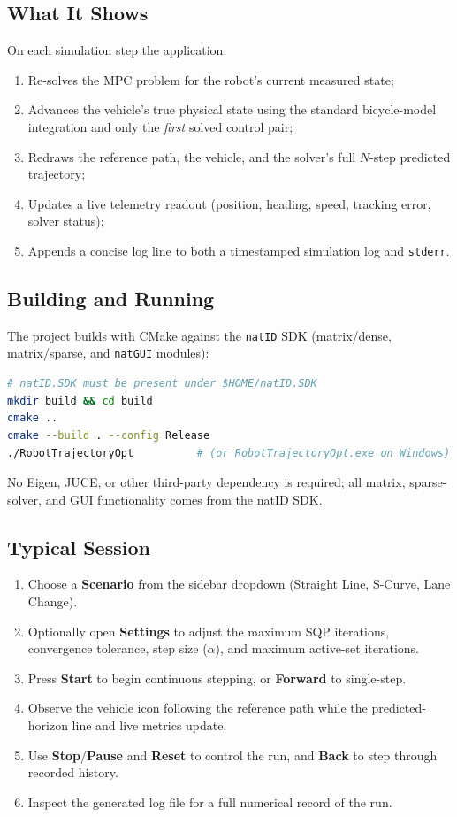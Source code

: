 ﻿\documentclass[11pt,a4paper]{article}
\begin{document}
\subsection{What It Shows}
On each simulation step the application:
\begin{enumerate}
  \item Re-solves the MPC problem for the robot's current measured state;
  \item Advances the vehicle's true physical state using the standard bicycle-model integration and only the \emph{first} solved control pair;
  \item Redraws the reference path, the vehicle, and the solver's full $N$-step predicted trajectory;
  \item Updates a live telemetry readout (position, heading, speed, tracking error, solver status);
  \item Appends a concise log line to both a timestamped simulation log and \texttt{stderr}.
\end{enumerate}

\subsection{Building and Running}
The project builds with CMake against the \texttt{natID} SDK (matrix/dense, matrix/sparse, and \texttt{natGUI} modules):
\begin{lstlisting}[language=bash]
# natID.SDK must be present under $HOME/natID.SDK
mkdir build && cd build
cmake ..
cmake --build . --config Release
./RobotTrajectoryOpt          # (or RobotTrajectoryOpt.exe on Windows)
\end{lstlisting}
No Eigen, JUCE, or other third-party dependency is required; all matrix, sparse-solver, and GUI functionality comes from the natID SDK.

\subsection{Typical Session}
\begin{enumerate}
  \item Choose a \textbf{Scenario} from the sidebar dropdown (Straight Line, S-Curve, Lane Change).
  \item Optionally open \textbf{Settings} to adjust the maximum SQP iterations, convergence tolerance, step size ($\alpha$), and maximum active-set iterations.
  \item Press \textbf{Start} to begin continuous stepping, or \textbf{Forward} to single-step.
  \item Observe the vehicle icon following the reference path while the predicted-horizon line and live metrics update.
  \item Use \textbf{Stop}/\textbf{Pause} and \textbf{Reset} to control the run, and \textbf{Back} to step through recorded history.
  \item Inspect the generated log file for a full numerical record of the run.
\end{enumerate}
\end{document}
